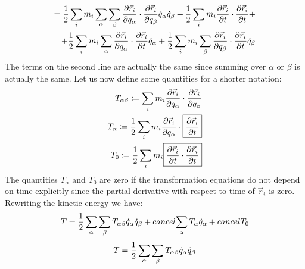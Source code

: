 \begin{equation}
    \begin{split}
        = \dfrac{1}{2}\displaystyle\sum_i m_i \displaystyle\sum_{\alpha}\displaystyle\sum_{\beta}\dfrac{\partial \vec{r}_i}{\partial q_{\alpha}}\cdot\dfrac{\partial \vec{r}_i}{\partial q_{\beta}}\dot{q}_{\alpha}\dot{q}_{\beta} + \dfrac{1}{2}\displaystyle\sum_i m_i \dfrac{\partial \vec{r}_i}{\partial t} \cdot \dfrac{\partial \vec{r}_i}{\partial t} +\\
        + \dfrac{1}{2}\displaystyle\sum_i m_i \displaystyle\sum_{\alpha}\dfrac{\partial \vec{r}_i}{\partial q_{\alpha}} \cdot \dfrac{\partial \vec{r}_i}{\partial t} \dot{q}_{\alpha} + \dfrac{1}{2}\displaystyle\sum_i m_i \displaystyle\sum_{\beta}\dfrac{\partial \vec{r}_i}{\partial q_{\beta}} \cdot \dfrac{\partial \vec{r}_i}{\partial t}\dot{q}_{\beta}
    \end{split}
\end{equation}
The terms on the second line are actually the same since summing over $\alpha$ or $\beta$ is actually the same. Let us now define some quantities for a shorter notation:
\begin{equation}
    \begin{split}
        T_{\alpha \beta} \coloneqq \displaystyle\sum_i m_i \dfrac{\partial \vec{r}_i}{\partial q_{\alpha}}\cdot\dfrac{\partial \vec{r}_i}{\partial q_{\beta}}\\
        T_{\alpha} \coloneqq \dfrac{1}{2} \displaystyle\sum_i m_i \dfrac{\partial \vec{r}_i}{\partial q_{\alpha}} \cdot \boxed{\dfrac{\partial \vec{r}_i}{\partial t}}\\
        T_0 \coloneqq \dfrac{1}{2}\displaystyle\sum_i m_i \boxed{\dfrac{\partial \vec{r}_i}{\partial t} \cdot \dfrac{\partial \vec{r}_i}{\partial t}}
    \end{split}
\end{equation}
The quantities $T_{\alpha}$ and $T_0$ are zero if the transformation equations do not depend on time explicitly since the partial derivative with respect to time of $\vec{r}_i$ is zero. Rewriting the kinetic energy we have:
\begin{equation}
    T = \dfrac{1}{2}\displaystyle\sum_{\alpha}\displaystyle\sum_{\beta}T_{\alpha \beta}\dot{q}_{\alpha}\dot{q}_{\beta} + \\cancel{\displaystyle\sum_{\alpha}T_{\alpha}\dot{q}_{\alpha}} + \\cancel{T_0}
\end{equation}
\begin{equation} \label{e:kinetic_energy}
    T = \dfrac{1}{2}\displaystyle\sum_{\alpha}\displaystyle\sum_{\beta}T_{\alpha \beta}\dot{q}_{\alpha}\dot{q}_{\beta}
\end{equation}
